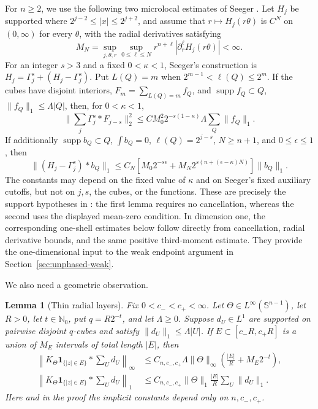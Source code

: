 \documentclass[11pt]{article}
\numberwithin{equation}{section}
\newtheorem{lemma}[theorem]{Lemma}
\theoremstyle{remark}
\theoremstyle{definition}
\newcommand{\Sph}{\mathbb S}
\newcommand{\supp}{\operatorname{supp}}
\newcommand{\norm}[1]{\lVert #1\rVert}
\begin{document}
For $n\ge2$, we use the following two microlocal estimates of Seeger
\cite[Lemmas~2.1 and 2.2]{Seeger96}.
Let $H_j$ be supported where $2^{j-2}\le|x|\le2^{j+2}$, and
assume that $r\mapsto H_j(r\theta)$ is $C^N$ on $(0,\infty)$ for every
$\theta$, with the radial derivatives satisfying
\begin{equation}\label{eq:MN}
 M_N=\sup_{j,\theta,r}\sup_{0\le\ell\le N}
 r^{n+\ell}|\partial_r^\ell H_j(r\theta)|<\infty.
\end{equation}
For an integer $s>3$ and a fixed $0<\kappa<1$, Seeger's construction
\cite[equation~(2.2)]{Seeger96} is
$H_j=\Gamma_j^s+(H_j-\Gamma_j^s)$.  Put $L(Q)=m$ when
$2^{m-1}<\ell(Q)\le2^m$.  If the cubes have disjoint interiors,
$F_m=\sum_{L(Q)=m}f_Q$, and
$\supp f_Q\subset Q$, $\norm{f_Q}_1\le\Lambda|Q|$, then, for
$0<\kappa<1$,
\begin{equation}\label{eq:seeger1}
 \norm{\sum_j\Gamma_j^s*F_{j-s}}_2^2
 \le C M_0^2 2^{-s(1-\kappa)}\Lambda\sum_Q\norm{f_Q}_1.
\end{equation}
If additionally $\supp b_Q\subset Q$, $\int b_Q=0$,
$\ell(Q)=2^{j-s}$, $N\ge n+1$, and
$0\le\epsilon\le1$, then
\begin{equation}\label{eq:seeger2}
 \norm{(H_j-\Gamma_j^s)*b_Q}_1
 \le C_N\left[M_0 2^{-s\epsilon}
 +M_N2^{s(n+(\epsilon-\kappa)N)}\right]\norm{b_Q}_1.
\end{equation}
The constants may depend on the fixed value of $\kappa$ and on Seeger's
fixed auxiliary cutoffs, but not on $j,s$, the cubes, or the functions.
These are precisely the support hypotheses in
\cite[Lemmas~2.1--2.2]{Seeger96}: the first lemma requires no cancellation,
whereas the second uses the displayed mean-zero condition.
In dimension one, the corresponding one-shell estimates below follow
directly from cancellation, radial derivative bounds, and the same
positive third-moment estimate. They provide the one-dimensional input
to the weak endpoint argument in Section~\ref{sec:unphased-weak}.

We also need a geometric observation.

\begin{lemma}[Thin radial layers]\label{lem:thinlayer}
Fix $0<c_-<c_+<\infty$.  Let $\Theta\in L^\infty(\Sph^{n-1})$, let
$R>0$, let $t\in\mathbb N_0$, put $q=R2^{-t}$, and let $\Lambda\ge0$.
Suppose $d_U\in L^1$ are supported on pairwise disjoint
$q$-cubes and satisfy $\norm{d_U}_1\le\Lambda|U|$.  If
$E\subset[c_-R,c_+R]$ is a
union of $M_E$ intervals of total length $|E|$, then
\begin{align}
 \left\|K_\Theta\mathbf1_{\{|z|\in E\}}*\sum_Ud_U\right\|_\infty
 &\le C_{n,c_-,c_+}\Lambda\norm\Theta_\infty
 \left(\frac{|E|}{R}+M_E2^{-t}\right),\label{eq:thinLinf}\\
 \left\|K_\Theta\mathbf1_{\{|z|\in E\}}*\sum_Ud_U\right\|_1
 &\le C_{n,c_-,c_+}\norm\Theta_1\frac{|E|}{R}
 \sum_U\norm{d_U}_1.
 \label{eq:thinL1}
\end{align}
Here and in the proof the implicit constants depend only on $n,c_-,c_+$.
\end{lemma}
\end{document}
